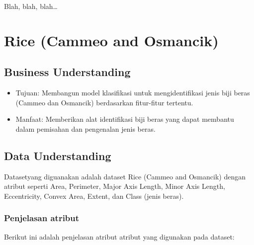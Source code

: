 \documentclass[
  letterpaper,
]{krantz}
\begin{document}
Blah, blah, blah\ldots{}

\mainmatter


\hypertarget{rice-cammeo-and-osmancik}{%
\chapter{Rice (Cammeo and Osmancik)}\label{rice-cammeo-and-osmancik}}

\hypertarget{business-understanding}{%
\section{Business Understanding}\label{business-understanding}}

\begin{itemize}
\item
  Tujuan: Membangun model klasifikasi untuk mengidentifikasi jenis biji
  beras (Cammeo dan Osmancik) berdasarkan fitur-fitur tertentu.
\item
  Manfaat: Memberikan alat identifikasi biji beras yang dapat membantu
  dalam pemisahan dan pengenalan jenis beras.
\end{itemize}

\hypertarget{data-understanding}{%
\section{Data Understanding}\label{data-understanding}}

Datasetyang diguanakan adalah dataset Rice (Cammeo and Osmancik) dengan
atribut seperti Area, Perimeter, Major Axis Length, Minor Axis Length,
Eccentricity, Convex Area, Extent, dan Class (jenis beras).

\hypertarget{penjelasan-atribut}{%
\subsection{Penjelasan atribut}\label{penjelasan-atribut}}

Berikut ini adalah penjelasan atribut atribut yang digunakan pada
dataset:
\end{document}

